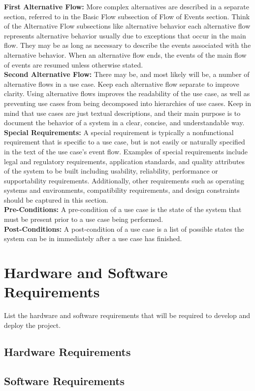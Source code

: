 \documentclass{FastFyp}
\begin{document}
\textbf{First Alternative Flow:} More complex alternatives are described in a separate section, referred to in the Basic Flow subsection of Flow of Events section. Think of the Alternative Flow subsections like alternative behavior each alternative flow represents alternative behavior usually due to exceptions that occur in the main flow. They may be as long as necessary to describe the events associated with the alternative behavior. When an alternative flow ends, the events of the main flow of events are resumed unless otherwise stated.\\
\textbf{Second Alternative Flow:} There may be, and most likely will be, a number of alternative flows in a use case. Keep each alternative flow separate to improve clarity. Using alternative flows improves the readability of the use case, as well as preventing use cases from being decomposed into hierarchies of use cases. Keep in mind that use cases are just textual descriptions, and their main purpose is to document the behavior of a system in a clear, concise, and understandable way.\\
\textbf{Special Requirements:} A special requirement is typically a nonfunctional requirement that is specific to a use case, but is not easily or naturally specified in the text of the use case’s event flow. Examples of special requirements include legal and regulatory requirements, application standards, and quality attributes of the system to be built including usability, reliability, performance or supportability requirements. Additionally, other requirements such as operating systems and environments, compatibility requirements, and design constraints should be captured in this section.\\
\textbf{Pre-Conditions:} A pre-condition of a use case is the state of the system that must be present prior to a use case being performed.\\
\textbf{Post-Conditions:} A post-condition of a use case is a list of possible states the system can be in immediately after a use case has finished.
\section{Hardware and Software Requirements}
List the hardware and software requirements that will be required to develop and deploy the project.
\subsection{Hardware Requirements}
\subsection{Software Requirements}
\end{document}

